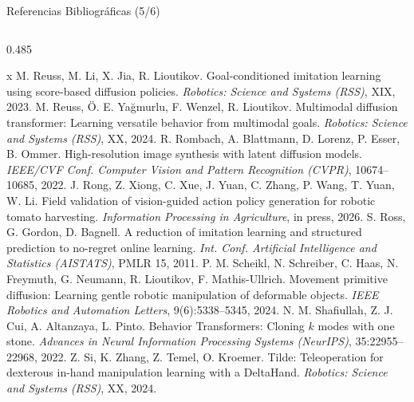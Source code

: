 \documentclass[aspectratio=169,10pt,xcolor={dvipsnames,table}]{beamer}
\begin{document}
\begin{frame}{Referencias Bibliográficas (5/6)}
  \begin{columns}[T, onlytextwidth]
    \begin{column}{0.485\textwidth}
      \RefsFont
      \begin{thebibliography}{x}\setlength{\itemsep}{0.8pt}
         M. Reuss, M. Li, X. Jia, R. Lioutikov. \newblock Goal-conditioned imitation learning using score-based diffusion policies. \newblock \emph{Robotics: Science and Systems (RSS)}, XIX, 2023.
         M. Reuss, Ö. E. Yağmurlu, F. Wenzel, R. Lioutikov. \newblock Multimodal diffusion transformer: Learning versatile behavior from multimodal goals. \newblock \emph{Robotics: Science and Systems (RSS)}, XX, 2024.
         R. Rombach, A. Blattmann, D. Lorenz, P. Esser, B. Ommer. \newblock High-resolution image synthesis with latent diffusion models. \newblock \emph{IEEE/CVF Conf. Computer Vision and Pattern Recognition (CVPR)}, 10674--10685, 2022.
         J. Rong, Z. Xiong, C. Xue, J. Yuan, C. Zhang, P. Wang, T. Yuan, W. Li. \newblock Field validation of vision-guided action policy generation for robotic tomato harvesting. \newblock \emph{Information Processing in Agriculture}, in press, 2026.
         S. Ross, G. Gordon, D. Bagnell. \newblock A reduction of imitation learning and structured prediction to no-regret online learning. \newblock \emph{Int. Conf. Artificial Intelligence and Statistics (AISTATS)}, PMLR 15, 2011.
         P. M. Scheikl, N. Schreiber, C. Haas, N. Freymuth, G. Neumann, R. Lioutikov, F. Mathis-Ullrich. \newblock Movement primitive diffusion: Learning gentle robotic manipulation of deformable objects. \newblock \emph{IEEE Robotics and Automation Letters}, 9(6):5338--5345, 2024.
         N. M. Shafiullah, Z. J. Cui, A. Altanzaya, L. Pinto. \newblock Behavior Transformers: Cloning $k$ modes with one stone. \newblock \emph{Advances in Neural Information Processing Systems (NeurIPS)}, 35:22955--22968, 2022.
         Z. Si, K. Zhang, Z. Temel, O. Kroemer. \newblock Tilde: Teleoperation for dexterous in-hand manipulation learning with a DeltaHand. \newblock \emph{Robotics: Science and Systems (RSS)}, XX, 2024.
      \end{thebibliography}

\end{column}
\end{columns}
\end{frame}
\end{document}
